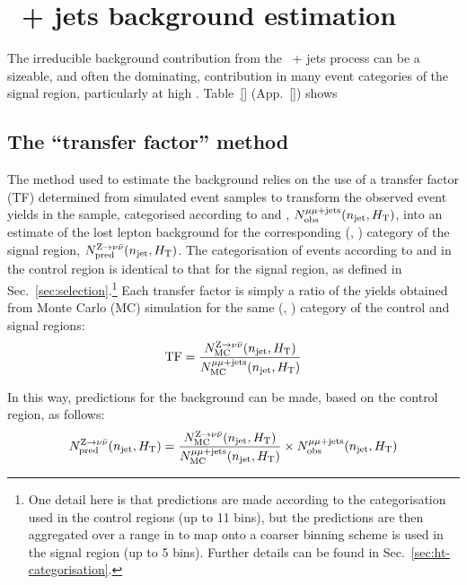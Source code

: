 
\section{\texorpdfstring{\znunu\ + jets}{Zinv} background estimation}
\label{sec:zinv}

The irreducible background contribution from the \znunu\ + jets
process can be a sizeable, and often the dominating, contribution in
many event categories of the signal region, particularly at high
\HTmiss. Table~\ref{} (App.~\ref{}) shows


\subsection{The ``transfer factor'' method}
\label{sec:tf-method-zinv}

The method used to estimate the \znunuj background relies on the use
of a transfer factor (TF) determined from simulated event samples to
transform the observed event yields in the \mmj sample, categorised
according to \njet and \scalht, $N_{\textrm{obs}}^{\mu\mu + \textrm{jets}}(n_{\text{jet}}, \mbox{$H_\text{T}$})$, into
an estimate of the lost lepton background for the corresponding
(\njet, \scalht) category of the signal region, $N_{\textrm{pred}}^{{\text Z} \rightarrow \nu\bar{\nu}}(n_{\text{jet}},
\mbox{$H_\text{T}$})$. The categorisation of events according to \njet and \scalht
in the \mmj control region is identical to that for the signal region,
as defined in Sec.~\ref{sec:selection}.\footnote{One detail here is
  that predictions are made according to the \scalht categorisation
  used in the control regions (up to 11 bins), but the predictions are
  then aggregated over a range in \scalht to map onto a coarser
  binning scheme is used in the signal region (up to 5 bins). Further
  details can be found in Sec.~\ref{sec:ht-categorisation}.}  Each
transfer factor is simply a ratio of the yields obtained from Monte
Carlo (MC) simulation for the same (\njet, \scalht) category of the
\mmj control and signal regions:
\begin{equation}
  \label{equ:tf-ratio}
  {\rm TF} = \frac{N_{\rm MC}^{{\text Z} \rightarrow \nu\bar{\nu}}(n_{\text{jet}}, \mbox{$H_\text{T}$})}{N_{\rm MC}^{\mu\mu + \textrm{jets}}(n_{\text{jet}}, \mbox{$H_\text{T}$})} 
\end{equation}

In this way, predictions for the \znunuj background can be made, based
on the \mmj control region, as follows:
\begin{equation}
  \label{equ:pred-method}
  N_{\textrm{pred}}^{{\text Z} \rightarrow \nu\bar{\nu}}(n_{\text{jet}}, \mbox{$H_\text{T}$}) = 
  \frac{N_{\rm MC}^{{\text Z} \rightarrow \nu\bar{\nu}}(n_{\text{jet}}, \mbox{$H_\text{T}$})}{N_{\rm MC}^{\mu\mu + \textrm{jets}}(n_{\text{jet}}, \mbox{$H_\text{T}$})} 
  \times 
  N_{\textrm{obs}}^{\mu\mu + \textrm{jets}}(n_{\text{jet}}, \mbox{$H_\text{T}$})   
\end{equation}

